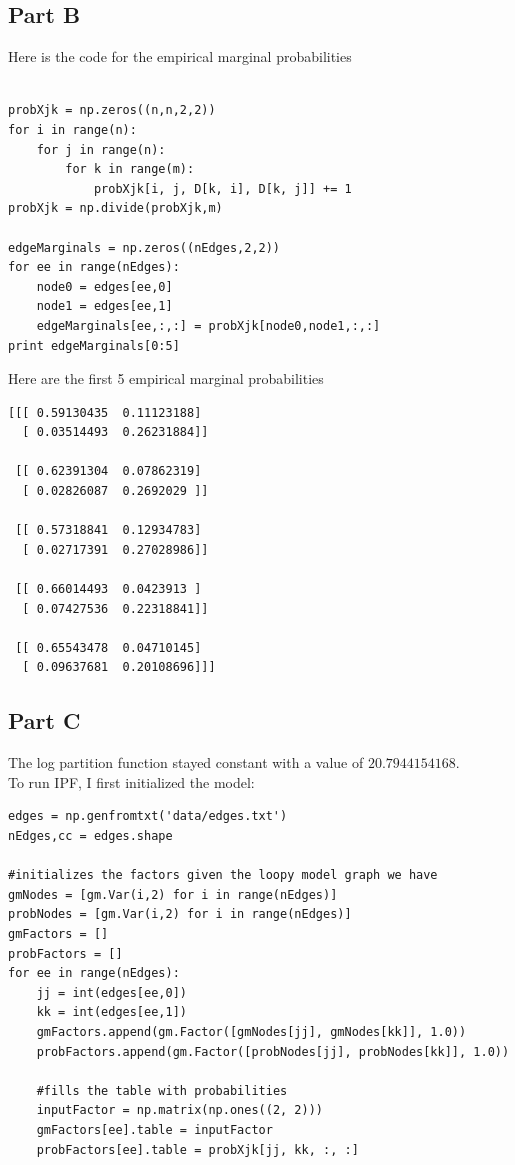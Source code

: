 \documentclass[twoside,11pt]{article}
\theoremstyle{definition}
\begin{document}
\newpage

\subsection*{Part B}

Here is the code for the empirical marginal probabilities
\begin{lstlisting}

probXjk = np.zeros((n,n,2,2))
for i in range(n):
    for j in range(n):
        for k in range(m):
            probXjk[i, j, D[k, i], D[k, j]] += 1
probXjk = np.divide(probXjk,m)

edgeMarginals = np.zeros((nEdges,2,2))
for ee in range(nEdges):
    node0 = edges[ee,0]
    node1 = edges[ee,1]
    edgeMarginals[ee,:,:] = probXjk[node0,node1,:,:]
print edgeMarginals[0:5]

\end{lstlisting}

Here are the first 5 empirical marginal probabilities

\begin{lstlisting}
[[[ 0.59130435  0.11123188]
  [ 0.03514493  0.26231884]]

 [[ 0.62391304  0.07862319]
  [ 0.02826087  0.2692029 ]]

 [[ 0.57318841  0.12934783]
  [ 0.02717391  0.27028986]]

 [[ 0.66014493  0.0423913 ]
  [ 0.07427536  0.22318841]]

 [[ 0.65543478  0.04710145]
  [ 0.09637681  0.20108696]]]
\end{lstlisting}
\newpage
\subsection*{Part C}

The log partition function stayed constant with a value of $20.7944154168$. \\
To run IPF, I first initialized the model:

\begin{lstlisting}
edges = np.genfromtxt('data/edges.txt')
nEdges,cc = edges.shape

#initializes the factors given the loopy model graph we have
gmNodes = [gm.Var(i,2) for i in range(nEdges)]
probNodes = [gm.Var(i,2) for i in range(nEdges)]
gmFactors = []
probFactors = []
for ee in range(nEdges):
    jj = int(edges[ee,0])
    kk = int(edges[ee,1])
    gmFactors.append(gm.Factor([gmNodes[jj], gmNodes[kk]], 1.0))
    probFactors.append(gm.Factor([probNodes[jj], probNodes[kk]], 1.0))

    #fills the table with probabilities
    inputFactor = np.matrix(np.ones((2, 2)))
    gmFactors[ee].table = inputFactor
    probFactors[ee].table = probXjk[jj, kk, :, :]
\end{lstlisting}
\end{document}
